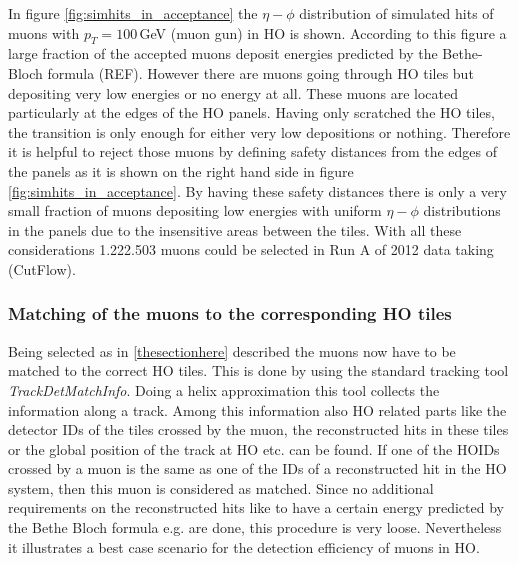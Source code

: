 			In figure \ref{fig:simhits_in_acceptance} the $\eta-\phi$ distribution of simulated hits of muons with $p_T = 100$\,GeV (muon gun) in HO is shown.
			According to this figure a large fraction of the accepted muons deposit energies predicted by the Bethe-Bloch formula (REF).
			However there are muons going through HO tiles but depositing very low energies or no energy at all.
			These muons are located particularly at the edges of the HO panels.
			Having only scratched the HO tiles, the transition is only enough for either very low depositions or nothing.
			Therefore it is helpful to reject those muons by defining safety distances from the edges of the panels as it is shown on the right hand side in figure \ref{fig:simhits_in_acceptance}.
			By having these safety distances there is only a very small fraction of muons depositing low energies with uniform $\eta-\phi$ distributions in the panels due to the insensitive areas between
			the tiles.
			With all these considerations 1.222.503 muons could be selected in Run A of 2012 data taking (CutFlow).
		\subsubsection{Matching of the muons to the corresponding HO tiles}
			Being selected as in \ref{thesectionhere} described the muons now have to be matched to the correct HO tiles.
			This is done by using the standard tracking tool \textit{TrackDetMatchInfo}.
			Doing a helix approximation this tool collects the information along a track.
			Among this information also HO related parts like the detector IDs of the tiles crossed by the muon, the reconstructed hits in these tiles or the global position of the track at HO etc. can be
			found.
			If one of the HOIDs crossed by a muon is the same as one of the IDs of a reconstructed hit in the HO system, then this muon is considered as matched.
			Since no additional requirements on the reconstructed hits like to have a certain energy predicted by the Bethe Bloch formula e.g. are done, this procedure is very loose.
			Nevertheless it illustrates a best case scenario for the detection efficiency of muons in HO.

